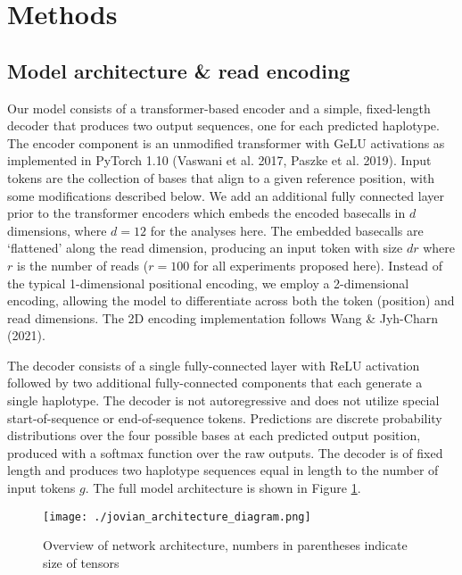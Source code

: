 \documentclass[]{article}
\begin{document}
\section{Methods}

\subsection{Model architecture \& read encoding}

Our model consists of a transformer-based encoder and a simple, fixed-length decoder that produces two output sequences, one for each predicted haplotype. The encoder component is an unmodified transformer with GeLU activations as implemented in PyTorch 1.10 (Vaswani et al. 2017, Paszke et al. 2019). Input tokens are the collection of bases that align to a given reference position, with some modifications described below. We add an additional fully connected layer prior to the transformer encoders which embeds the encoded basecalls in $d$ dimensions, where $d=12$ for the analyses here. The embedded basecalls are `flattened' along the read dimension, producing an input token with size $dr$ where $r$ is the number of reads ($r=100$ for all experiments proposed here).  Instead of the typical 1-dimensional positional encoding, we employ a 2-dimensional encoding, allowing the model to differentiate across both the token (position) and read dimensions. The 2D encoding implementation follows Wang \& Jyh-Charn (2021).

The decoder consists of a single fully-connected layer with ReLU activation followed by two additional fully-connected components that each generate a single haplotype. The decoder is not autoregressive and does not utilize special start-of-sequence or end-of-sequence tokens. Predictions are discrete probability distributions over the four possible bases at each predicted output position, produced with a softmax function over the raw outputs. The decoder is of fixed length and produces two haplotype sequences equal in length to the number of input tokens $g$. The full model architecture is shown in Figure \ref{fig:architecture}. 


\begin{figure}[htp]
	\texttt{[image: ./jovian\_architecture\_diagram.png]}
	\caption{ Overview of network architecture, numbers in parentheses indicate size of tensors}
	\label{fig:architecture}
\end{figure}
\end{document}
